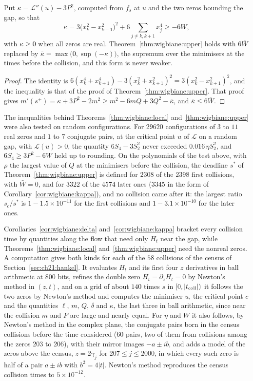 \begin{corollary}\label{cor:wigbiane:kappa}
Put $\kappa=\mathcal L''(u)-3P^2$, computed from $f_s$ at $u$ and the two zeros bounding the gap, so that
\[
\kappa=3\big(x_k^2-x_{k+1}^2\big)^2+6\sum_{j\ne k,k+1}x_j^4\ge-6W,
\]
with $\kappa\ge0$ when all zeros are real. Theorem~\ref{thm:wigbiane:upper} holds with $6\bar W$ replaced by $\bar\kappa=\max\big(0,\sup(-\kappa)\big)$, the supremum over the minimisers at the times before the collision, and this form is never weaker.
\end{corollary}

\begin{proof}
The identity is $6(x_k^4+x_{k+1}^4)-3(x_k^2+x_{k+1}^2)^2=3(x_k^2-x_{k+1}^2)^2$, and the inequality is that of the proof of Theorem~\ref{thm:wigbiane:upper}. That proof gives $m'(s^+)=\kappa+3P^2-2m^2\ge m^2-6mQ+3Q^2-\bar\kappa$, and $\bar\kappa\le6\bar W$.
\end{proof}

The inequalities behind Theorems~\ref{thm:wigbiane:local} and~\ref{thm:wigbiane:upper} were also tested on random configurations. For $29620$ configurations of $3$ to $11$ real zeros and $1$ to $7$ conjugate pairs, at the critical point $u$ of $\mathcal L$ on a random gap, with $\mathcal L(u)>0$, the quantity $6S_4-3S_2^2$ never exceeded $0.016\,\eta S_2^2$, and $6S_4\ge3P^2-6W$ held up to rounding. On the polynomials of the test above, with $\rho$ the largest value of $Q$ at the minimisers before the collision, the deadline $s^*$ of Theorem~\ref{thm:wigbiane:upper} is defined for $2308$ of the $2398$ first collisions, with $\bar W=0$, and for $3322$ of the $4574$ later ones ($3345$ in the form of Corollary~\ref{cor:wigbiane:kappa}), and no collision came after it: the largest ratio $s_c/s^*$ is $1-1.5\times10^{-11}$ for the first collisions and $1-3.1\times10^{-10}$ for the later ones.

Corollaries~\ref{cor:wigbiane:delta} and~\ref{cor:wigbiane:kappa} bracket every collision time by quantities along the flow that need only $H_t$ near the gap, while Theorems~\ref{thm:wigbiane:local} and~\ref{thm:wigbiane:upper} need the nonreal zeros. A computation gives both kinds for each of the $58$ collisions of the census of Section~\ref{sec:ch21:hankel}. It evaluates $H_t$ and its first four $z$ derivatives in ball arithmetic at $800$ bits, refines the double zero $H_t=\partial_zH_t=0$ by Newton's method in $(z,t)$, and on a grid of about $140$ times $s$ in $[0,|t_{\rm coll}|)$ it follows the two zeros by Newton's method and computes the minimiser $u$, the critical point $c$ and the quantities $\ell$, $m$, $Q$, $\delta$ and $\kappa$, the last three in ball arithmetic, since near the collision $m$ and $P$ are large and nearly equal. For $\eta$ and $W$ it also follows, by Newton's method in the complex plane, the conjugate pairs born in the census collisions before the time considered ($60$ pairs, two of them from collisions among the zeros $203$ to $206$), with their mirror images $-a\pm ib$, and adds a model of the zeros above the census, $z=2\gamma_j$ for $207\le j\le2000$, in which every such zero is half of a pair $a\pm ib$ with $b^2=4|t|$. Newton's method reproduces the census collision times to $5\times10^{-12}$.


